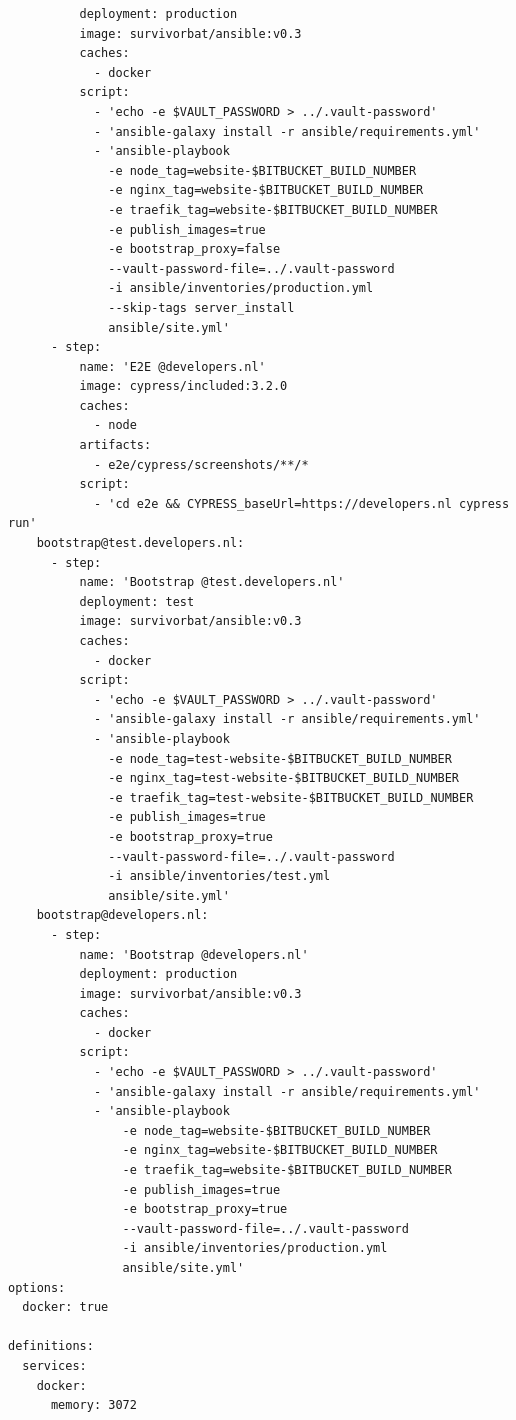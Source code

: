 \begin{verbatim}
          deployment: production
          image: survivorbat/ansible:v0.3
          caches:
            - docker
          script:
            - 'echo -e $VAULT_PASSWORD > ../.vault-password'
            - 'ansible-galaxy install -r ansible/requirements.yml'
            - 'ansible-playbook
              -e node_tag=website-$BITBUCKET_BUILD_NUMBER
              -e nginx_tag=website-$BITBUCKET_BUILD_NUMBER
              -e traefik_tag=website-$BITBUCKET_BUILD_NUMBER
              -e publish_images=true
              -e bootstrap_proxy=false
              --vault-password-file=../.vault-password
              -i ansible/inventories/production.yml
              --skip-tags server_install
              ansible/site.yml'
      - step:
          name: 'E2E @developers.nl'
          image: cypress/included:3.2.0
          caches:
            - node
          artifacts:
            - e2e/cypress/screenshots/**/*
          script:
            - 'cd e2e && CYPRESS_baseUrl=https://developers.nl cypress run'
    bootstrap@test.developers.nl:
      - step:
          name: 'Bootstrap @test.developers.nl'
          deployment: test
          image: survivorbat/ansible:v0.3
          caches:
            - docker
          script:
            - 'echo -e $VAULT_PASSWORD > ../.vault-password'
            - 'ansible-galaxy install -r ansible/requirements.yml'
            - 'ansible-playbook
              -e node_tag=test-website-$BITBUCKET_BUILD_NUMBER
              -e nginx_tag=test-website-$BITBUCKET_BUILD_NUMBER
              -e traefik_tag=test-website-$BITBUCKET_BUILD_NUMBER
              -e publish_images=true
              -e bootstrap_proxy=true
              --vault-password-file=../.vault-password
              -i ansible/inventories/test.yml
              ansible/site.yml'
    bootstrap@developers.nl:
      - step:
          name: 'Bootstrap @developers.nl'
          deployment: production
          image: survivorbat/ansible:v0.3
          caches:
            - docker
          script:
            - 'echo -e $VAULT_PASSWORD > ../.vault-password'
            - 'ansible-galaxy install -r ansible/requirements.yml'
            - 'ansible-playbook
                -e node_tag=website-$BITBUCKET_BUILD_NUMBER
                -e nginx_tag=website-$BITBUCKET_BUILD_NUMBER
                -e traefik_tag=website-$BITBUCKET_BUILD_NUMBER
                -e publish_images=true
                -e bootstrap_proxy=true
                --vault-password-file=../.vault-password
                -i ansible/inventories/production.yml
                ansible/site.yml'
options:
  docker: true

definitions:
  services:
    docker:
      memory: 3072
\end{verbatim}